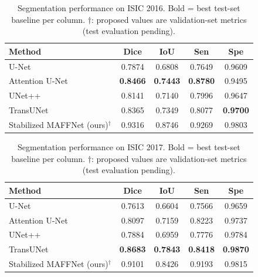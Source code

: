 %

\begin{table}[t]
\centering
\caption{Segmentation performance on ISIC 2016. Bold = best test-set baseline per
column. $\dagger$: proposed values are validation-set metrics (test evaluation pending).}
\label{tab:isic2016}
\begin{tabular}{lcccc}
\toprule
Method & Dice & IoU & Sen & Spe \\
\midrule
U-Net           & 0.7874 & 0.6808 & 0.7649 & 0.9609 \\
Attention U-Net & \textbf{0.8466} & \textbf{0.7443} & \textbf{0.8780} & 0.9495 \\
UNet++          & 0.8141 & 0.7140 & 0.7996 & 0.9647 \\
TransUNet       & 0.8365 & 0.7349 & 0.8077 & \textbf{0.9700} \\
Stabilized MAFFNet (ours)$^{\dagger}$ & 0.9316 & 0.8746 & 0.9269 & 0.9803 \\
\bottomrule
\end{tabular}
\end{table}

\begin{table}[t]
\centering
\caption{Segmentation performance on ISIC 2017. Bold = best test-set baseline per
column. $\dagger$: proposed values are validation-set metrics (test evaluation pending).}
\label{tab:isic2017}
\begin{tabular}{lcccc}
\toprule
Method & Dice & IoU & Sen & Spe \\
\midrule
U-Net           & 0.7613 & 0.6604 & 0.7566 & 0.9659 \\
Attention U-Net & 0.8097 & 0.7159 & 0.8223 & 0.9737 \\
UNet++          & 0.7884 & 0.6959 & 0.7776 & 0.9784 \\
TransUNet       & \textbf{0.8683} & \textbf{0.7843} & \textbf{0.8418} & \textbf{0.9870} \\
Stabilized MAFFNet (ours)$^{\dagger}$ & 0.9101 & 0.8426 & 0.9193 & 0.9815 \\
\bottomrule
\end{tabular}
\end{table}

